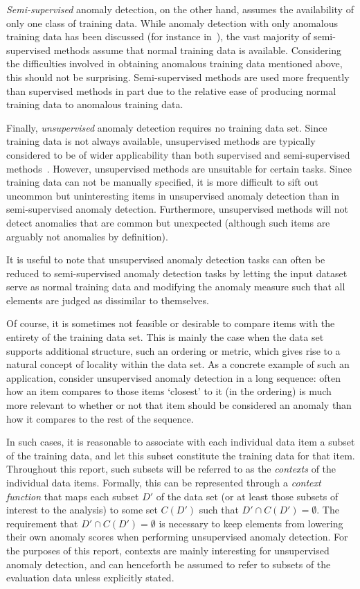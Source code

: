 \emph{Semi-supervised} anomaly detection, on the other hand, assumes the availability of only one class of training data. While anomaly detection with only anomalous training data has been discussed (for instance in~\cite{dasgupta}), the vast majority of semi-supervised methods assume that normal training data is available. Considering the difficulties involved in obtaining anomalous training data mentioned above, this should not be surprising. Semi-supervised methods are used more frequently than supervised methods in part due to the relative ease of producing normal training data to anomalous training data.

Finally, \emph{unsupervised} anomaly detection requires no training data set. Since training data is not always available, unsupervised methods are typically considered to be of wider applicability than both supervised and semi-supervised methods~\cite{chandola}. However, unsupervised methods are unsuitable for certain tasks. Since training data can not be manually specified, it is more difficult to sift out uncommon but uninteresting items in unsupervised anomaly detection than in semi-supervised anomaly detection. Furthermore, unsupervised methods will not detect anomalies that are common but unexpected (although such items are arguably not anomalies by definition).

It is useful to note that unsupervised anomaly detection tasks can often be reduced to semi-supervised anomaly detection tasks by letting the input dataset serve as normal training data and modifying the anomaly measure such that all elements are judged as dissimilar to themselves.

Of course, it is sometimes not feasible or desirable to compare items with the entirety of the training data set. This is mainly the case when the data set supports additional structure, such an ordering or metric, which gives rise to a natural concept of locality within the data set. As a concrete example of such an application, consider unsupervised anomaly detection in a long sequence: often how an item compares to those items `closest' to it (in the ordering) is much more relevant to whether or not that item should be considered an anomaly than how it compares to the rest of the sequence.

In such cases, it is reasonable to associate with each individual data item a subset of the training data, and let this subset constitute the training data for that item. Throughout this report, such subsets will be referred to as the \emph{contexts} of the individual data items. Formally, this can be represented through a \emph{context function} that maps each subset $D'$ of the data set (or at least those subsets of interest to the analysis) to some set $C(D')$ such that $D' \cap C(D') = \emptyset$. The requirement that $D' \cap C(D') = \emptyset$ is necessary to keep elements from lowering their own anomaly scores when performing unsupervised anomaly detection. For the purposes of this report, contexts are mainly interesting for unsupervised anomaly detection, and can henceforth be assumed to refer to subsets of the evaluation data unless explicitly stated.

